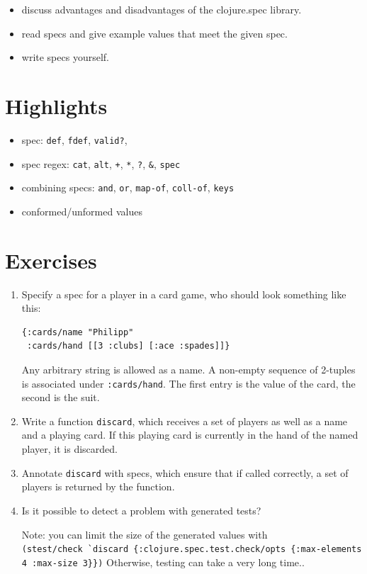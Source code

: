 \documentclass[11pt,a4paper]{article}
\begin{document}
\begin{itemize}
    \item discuss advantages and disadvantages of the clojure.spec library.
    \item read specs and give example values that meet the given spec.
    \item write specs yourself.
\end{itemize}

\section{Highlights}

\begin{itemize}
    \item spec: \verb|def|, \verb|fdef|, \verb|valid?|,
    \item spec regex: \verb|cat|, \verb|alt|, \verb|+|, \verb|*|, \verb|?|, \verb|&|, \verb|spec|
    \item combining specs: \verb|and|, \verb|or|, \verb|map-of|, \verb|coll-of|, \verb|keys|
    \item conformed/unformed values
\end{itemize}



\section{Exercises}

\begin{exercise}[Specs]
\begin{enumerate}[label=\alph*)]
\item
Specify a spec for a player in a card game,
who should look something like this:

\begin{verbatim}
{:cards/name "Philipp"
 :cards/hand [[3 :clubs] [:ace :spades]]} 
\end{verbatim}

Any arbitrary string is allowed as a name.
A non-empty sequence of 2-tuples is associated under \verb|:cards/hand|.
The first entry is the value of the card, the second is the suit.

\item
Write a function \verb|discard|,
which receives a set of players
as well as a name and a playing card.
If this playing card is currently in the hand
of the named player, it is discarded.

\item
Annotate \verb|discard| with specs, which ensure
that if called correctly, a set of players
is returned by the function.

\item
Is it possible to detect a problem with generated tests?

Note: you can limit the size of the generated values with\\
\verb|(stest/check `discard {:clojure.spec.test.check/opts {:max-elements 4 :max-size 3}})|
Otherwise, testing can take a very long time..
\end{enumerate}
\end{exercise}
\end{document}
